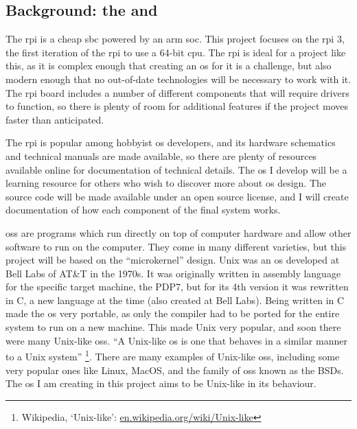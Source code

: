 \documentclass{article}
\begin{document}
\subsection{Background: the \texorpdfstring{}{Raspberry Pi} and
\texorpdfstring{}{Operating Systems}}
The \gls{rpi} is a cheap \gls{sbc} powered by an \gls{arm} \gls{soc}. This
project focuses on the \gls{rpi} 3, the first iteration of the \gls{rpi} to use
a 64-bit \gls{cpu}. The \gls{rpi} is ideal for a project like this, as it is
complex enough that creating an \gls{os} for it is a challenge, but also modern
enough that no out-of-date technologies will be necessary to work with it. The
\gls{rpi} board includes a number of different components that will require
drivers to function, so there is plenty of room for additional features if the
project moves faster than anticipated.

The \gls{rpi} is popular among hobbyist \gls{os} developers, and its hardware
schematics and technical manuals are made available, so there are plenty of
resources available online for documentation of technical details. The \gls{os}
I develop will be a learning resource for others who wish to discover more
about \gls{os} design. The source code will be made available under an open
source license, and I will create documentation of how each component of the
final system
works.

\glspl{os} are programs which run directly on top of computer hardware and
allow other software to run on the computer. They come in many different
varieties, but this project will be based on the ``microkernel'' design. Unix
was an \gls{os} developed at Bell Labs of AT\&T in the 1970s. It was originally
written in assembly language for the specific target machine, the PDP7, but for
its 4th version it was rewritten in C, a new language at the time (also created
at Bell Labs). Being written in C made the \gls{os} very portable, as only the
compiler had to be ported for the entire system to run on a new machine. This
made Unix very popular, and soon there were many Unix-like \glspl{os}. ``A
Unix-like \gls{os} is one that behaves in a similar manner to a Unix
system''
\footnote{Wikipedia, `Unix-like': \url{en.wikipedia.org/wiki/Unix-like}}.
There are many examples of Unix-like \glspl{os}, including some very popular
ones like Linux, MacOS, and the family of \glspl{os} known as the BSDs. The
\gls{os} I am creating in this project aims to be Unix-like in its behaviour.
\end{document}
